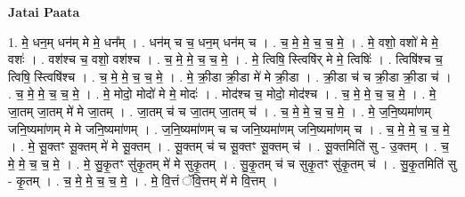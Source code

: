 \documentclass[17pt]{extarticle}
\begin{document}
\textbf{Jatai Paata} \newline

1. मे॒ धन॒म् धन॑म् मे मे॒ धन᳚म् । . धन॑म् च च॒ धन॒म् धन॑म् च । . च॒ मे॒ मे॒ च॒ च॒ मे॒ । . मे॒ वशो॒ वशो॑ मे मे॒ वशः॑ । . वश॑श्च च॒ वशो॒ वश॑श्च । . च॒ मे॒ मे॒ च॒ च॒ मे॒ । . मे॒ त्विषि॒ स्त्विषि॑र् मे मे॒ त्विषिः॑ । . त्विषि॑श्च च॒ त्विषि॒ स्त्विषि॑श्च । . च॒ मे॒ मे॒ च॒ च॒ मे॒ । . मे॒ क्री॒डा क्री॒डा मे॑ मे क्री॒डा । . क्री॒डा च॑ च क्री॒डा क्री॒डा च॑ । . च॒ मे॒ मे॒ च॒ च॒ मे॒ । . मे॒ मोदो॒ मोदो॑ मे मे॒ मोदः॑ । . मोद॑श्च च॒ मोदो॒ मोद॑श्च । . च॒ मे॒ मे॒ च॒ च॒ मे॒ । . मे॒ जा॒तम् जा॒तम् मे॑ मे जा॒तम् । . जा॒तम् च॑ च जा॒तम् जा॒तम् च॑ । . च॒ मे॒ मे॒ च॒ च॒ मे॒ । . मे॒ ज॒नि॒ष्यमा॑णम् जनि॒ष्यमा॑णम् मे मे जनि॒ष्यमा॑णम् । . ज॒नि॒ष्यमा॑णम् च च जनि॒ष्यमा॑णम् जनि॒ष्यमा॑णम् च । . च॒ मे॒ मे॒ च॒ च॒ मे॒ । . मे॒ सू॒क्तꣳ सू॒क्तम् मे॑ मे सू॒क्तम् । . सू॒क्तम् च॑ च सू॒क्तꣳ सू॒क्तम् च॑ । . सू॒क्तमिति॑ सु - उ॒क्तम् । . च॒ मे॒ मे॒ च॒ च॒ मे॒ । . मे॒ सु॒कृ॒तꣳ सु॑कृ॒तम् मे॑ मे सुकृ॒तम् । . सु॒कृ॒तम् च॑ च सुकृ॒तꣳ सु॑कृ॒तम् च॑ । . सु॒कृ॒तमिति॑ सु - कृ॒तम् । . च॒ मे॒ मे॒ च॒ च॒ मे॒ । . मे॒ वि॒त्तं ॅवि॒त्तम् मे॑ मे वि॒त्तम् । \newline
\end{document}
